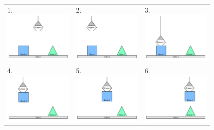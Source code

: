 \begin{figure}
\centering
\begin{tabular}{p{3.5cm}p{3.5cm}p{3.5cm}}
1. \includegraphics[width=3.5cm]{gfx/blocks_world_example-1}  & 2. \includegraphics[width=3.5cm]{gfx/blocks_world_example-2}  & 3. \includegraphics[width=3.5cm]{gfx/blocks_world_example-3} \\
4. \includegraphics[width=3.5cm]{gfx/blocks_world_example-4}  & 5. \includegraphics[width=3.5cm]{gfx/blocks_world_example-5}  & 6. \includegraphics[width=3.5cm]{gfx/blocks_world_example-6} \\

\end{tabular}
\end{figure}
